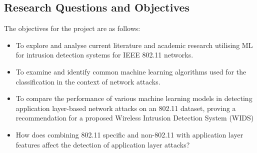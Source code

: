\subsection{Research Questions and Objectives}
\label{sec:Research Question}

The objectives for the project are as follows:
\begin{itemize}
\item To explore and analyse current literature and academic research utilising ML for intrusion detection systems for IEEE 802.11 networks.
\end{itemize}
\begin{itemize}
\item To examine and identify common machine learning algorithms used for the classification in the context of network attacks.
\end{itemize}
\begin{itemize}
\item To compare the performance of various machine learning models in detecting application layer-based network attacks on an 802.11 dataset, proving a recommendation for a proposed Wireless Intrusion Detection System (WIDS)
\item How does combining 802.11 specific and non-802.11 with application layer features affect the detection of application layer attacks?
\end{itemize}

